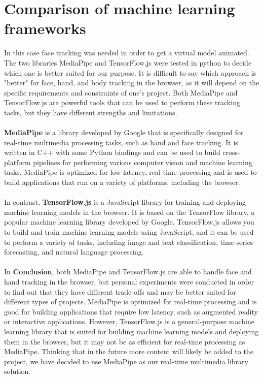 \section{Comparison of machine learning frameworks}
In this case face tracking was needed in order to get a virtual model animated. 
The two libraries MediaPipe and TensorFlow.js were tested in python to decide 
which one is better suited for our purpose. It is difficult to say which approach 
is "better" for face, hand, and body tracking in the browser, as it will depend 
on the specific requirements and constraints of one's project. Both MediaPipe and 
TensorFlow.js are powerful tools that can be used to perform these tracking tasks, 
but they have different strengths and limitations.
\\
\\
\textbf{MediaPipe} is a library developed by Google that is specifically designed 
for real-time multimedia processing tasks, such as hand and face tracking. 
It is written in C++ with some Python bindings and can be used to build cross-platform 
pipelines for performing various computer vision and machine learning tasks. MediaPipe is 
optimized for low-latency, real-time processing and is used to build applications that run 
on a variety of platforms, including the browser.
\\
\\
In contrast, \textbf{TensorFlow.js} is a JavaScript library for training and deploying machine 
learning models in the browser. It is based on the TensorFlow library, a popular machine 
learning library developed by Google. TensorFlow.js allows you to build and train machine 
learning models using JavaScript, and it can be used to perform a variety of tasks, including 
image and text classification, time series forecasting, and natural language processing.
\\
\\
In \textbf{Conclusion}, both MediaPipe and TensorFlow.js are able to handle face and hand
tracking in the browser, but personal experiments were conducted in order to find out 
that they have different trade-offs and may be better suited
for different types of projects. MediaPipe is optimized for real-time processing and is
good for building applications that require low latency, such as augmented reality or
interactive applications. However, TensorFlow.js is a general-purpose machine learning
library that is suited for building machine learning models and deploying them in the
browser, but it may not be as efficient for real-time processing as MediaPipe. Thinking
that in the future more content will likely be added to the project, we have decided to
use MediaPipe as our real-time multimedia library solution.

